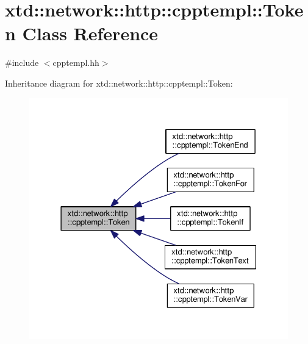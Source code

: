 \hypertarget{classxtd_1_1network_1_1http_1_1cpptempl_1_1Token}{\section{xtd\-:\-:network\-:\-:http\-:\-:cpptempl\-:\-:Token Class Reference}
\label{classxtd_1_1network_1_1http_1_1cpptempl_1_1Token}
}


{\ttfamily \#include $<$cpptempl.\-hh$>$}



Inheritance diagram for xtd\-:\-:network\-:\-:http\-:\-:cpptempl\-:\-:Token\-:
\nopagebreak
\begin{figure}[H]
\begin{center}
\leavevmode
\includegraphics[width=328pt]{classxtd_1_1network_1_1http_1_1cpptempl_1_1Token__inherit__graph}
\end{center}
\end{figure}
